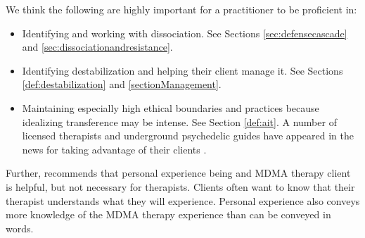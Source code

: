 \documentclass[12pt,letterpaper]{book}
\begin{document}
We think the following are highly important for a practitioner to be proficient in:
\begin{itemize}
    \item Identifying and working with dissociation. See Sections \ref{sec:defensecascade} and \ref{sec:dissociationandresistance}.
    \item Identifying destabilization and helping their client manage it. See Sections \ref{def:destabilization} and \ref{sectionManagement}.
    \item Maintaining especially high ethical boundaries and practices because idealizing transference may be intense. See Section \ref{def:ait}. A number of licensed therapists and underground psychedelic guides have appeared in the news for taking advantage of their clients \cite{powerTrip}.
\end{itemize}
Further, \textcite{simmering} recommends that personal experience being and MDMA therapy client is helpful, but not necessary for therapists. Clients often want to know that their therapist understands what they will experience. Personal experience also conveys more knowledge of the MDMA therapy experience than can be conveyed in words.
\end{document}
